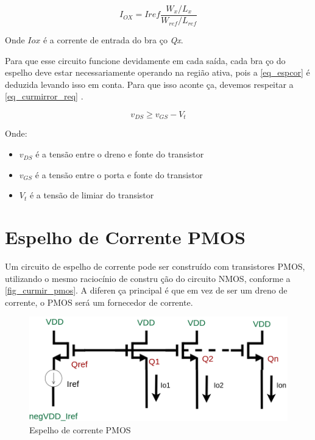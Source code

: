\begin{equation}
    \label{eq_espcor}
    I_{OX} = Iref\frac{W_x/L_x}{W_{ref}/L_{ref}}
\end{equation}

Onde $I{ox}$ \'e a corrente de entrada do bra ço \emph{Qx}. 

Para que esse circuito funcione devidamente em cada sa\'ida, cada bra ço do espelho deve estar necessariamente operando na região ativa, pois a \autoref{eq_espcor} \'e deduzida levando isso em conta. Para que isso aconte ça, devemos respeitar a \autoref{eq_curmirror_req} \cite{RazaviFundM}.

\begin{equation}
    \label{eq_curmirror_req}
    v_{DS} \geq v_{GS} - V_t
\end{equation}

Onde:

\begin{itemize}
    \item $v_{DS}$ \'e a tensão entre o dreno e fonte do transistor
    \item $v_{GS}$ \'e a tensão entre o porta e fonte do transistor
    \item $V_{t}$ \'e a tensão de limiar do transistor
\end{itemize}

\section{Espelho de Corrente PMOS}

Um circuito de espelho de corrente pode ser constru\'ido com transistores PMOS, utilizando o mesmo racioc\'inio de constru ção do circuito NMOS, conforme a \autoref{fig_curmir_pmos}. A diferen ça principal \'e que em vez de ser um dreno de corrente, o PMOS ser\'a um fornecedor de corrente.

\begin{figure}[htb]
    \label{fig_curmir_pmos}
    \centering
    \caption{Espelho de corrente PMOS} 
    \includegraphics[scale=0.4]{Circuitos/current_mirror_example_pmos.png}
\end{figure}

